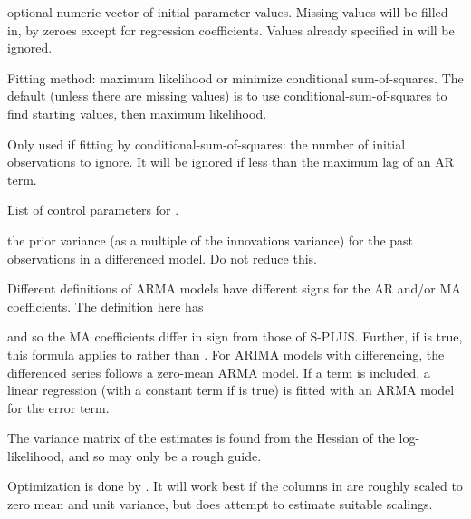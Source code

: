 \begin{Arguments}
\begin{ldescription}
\item[\code{init}] optional numeric vector of initial parameter
values.  Missing values will be filled in, by zeroes except for
regression coefficients.  Values already specified in 
will be ignored.
\item[\code{method}] Fitting method: maximum likelihood or minimize
conditional sum-of-squares.  The default (unless there are missing
values) is to use conditional-sum-of-squares to find starting
values, then maximum likelihood.
\item[\code{n.cond}] Only used if fitting by conditional-sum-of-squares: the
number of initial observations to ignore.  It will be ignored if
less than the maximum lag of an AR term.
\item[\code{optim.control}] List of control parameters for .
\item[\code{kappa}] the prior variance (as a multiple of the innovations
variance) for the past observations in a differenced model.  Do not
reduce this.
\end{ldescription}
\end{Arguments}
\begin{Details}\relax
Different definitions of ARMA models have different signs for the
AR and/or MA coefficients. The definition here has


and so the MA coefficients differ in sign from those of
S-PLUS.  Further, if  is true, this formula
applies to  rather than .  For ARIMA models with
differencing, the differenced series follows a zero-mean ARMA model.
If a  term is included, a linear regression (with a
constant term if  is true) is fitted with an ARMA
model for the error term.

The variance matrix of the estimates is found from the Hessian of
the log-likelihood, and so may only be a rough guide.

Optimization is done by . It will work
best if the columns in  are roughly scaled to zero mean
and unit variance, but does attempt to estimate suitable scalings.
\end{Details}
